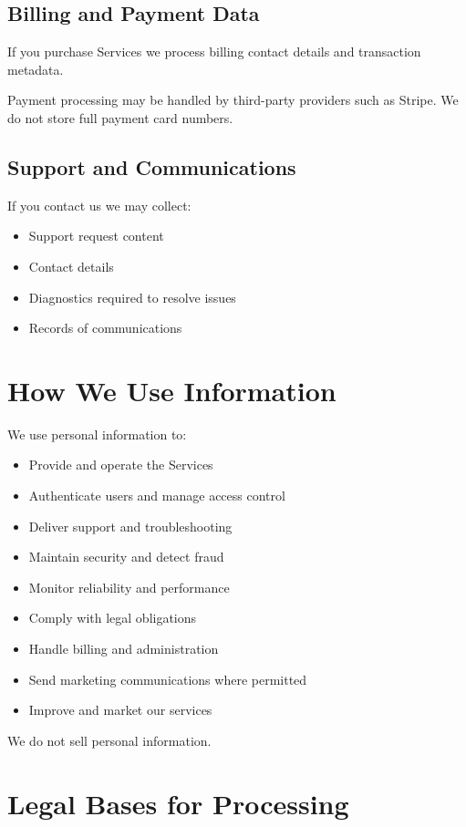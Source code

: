 \documentclass[11pt]{article}
\begin{document}
\subsection{Billing and Payment Data}

If you purchase Services we process billing contact details and transaction metadata.

Payment processing may be handled by third-party providers such as Stripe. We do not store full payment card numbers.

\subsection{Support and Communications}

If you contact us we may collect:

\begin{itemize}
\item Support request content
\item Contact details
\item Diagnostics required to resolve issues
\item Records of communications
\end{itemize}

\section{How We Use Information}

We use personal information to:

\begin{itemize}
\item Provide and operate the Services
\item Authenticate users and manage access control
\item Deliver support and troubleshooting
\item Maintain security and detect fraud
\item Monitor reliability and performance
\item Comply with legal obligations
\item Handle billing and administration
\item Send marketing communications where permitted
\item Improve and market our services
\end{itemize}

We do not sell personal information.

\section{Legal Bases for Processing}
\end{document}
